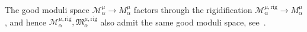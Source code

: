 \documentclass[12pt]{amsart}
\theoremstyle{definition}
\newtheorem{definition}{Definition}[section]
\newtheorem{assumption}[definition]{Assumption}
\newcommand{\CA}{{\mathcal A}}
\newcommand{\CM}{{\mathcal M}}
\newcommand{\1}{\mathbf 1}
\newcommand{\FM}{{\mathfrak{M}}}
\newcommand{\rig}{\mathrm{rig}}
\begin{document}
The good moduli space $\CM_{\alpha}^\mu\to M_\alpha^\mu$ factors through the rigidification $\CM_{\alpha}^{\mu, \rig}\to M_\alpha^\mu$, and hence $\CM_{\alpha}^{\mu, \rig}, \FM_{\alpha}^{\mu, \rig}$ also admit the same good moduli space, see~\cite[Subsection 1.0.4]{HLverlinde}.










\end{document}

